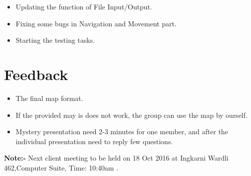\documentclass[11pt, a4paper]{article}
\begin{document}
\begin{itemize}
\item Updating the function of File Input/Output.
\item Fixing some bugs in Navigation and Movement part.
\item Starting the testing tasks.
\end{itemize}


\section{Feedback}
\begin{itemize}
\item The final map format.
\item If the provided may is does not work, the group can use the map by ourself.
\item Mystery presentation need 2-3 minutes for one member, and after the individual presentation need to reply few questions.
\end{itemize}

\vspace*{20pt}
\noindent  \textbf{Note:-} Next client meeting to be held on 18 Oct 2016 at Ingkarni Wardli 462,Computer Suite, Time: 10:40am .
\end{document}
